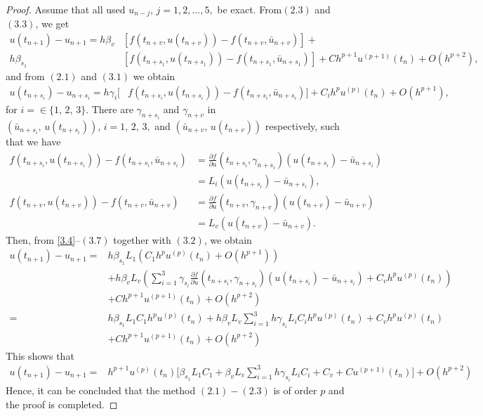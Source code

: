 ‎\documentclass[a4paper,10pt]{article}‎
\begin{document}
\begin{proof}
Assume that all used
 $u_{n-j},\,j=1,2,\ldots,5,$  be exact. From$(2.3)$ and $(3.3)$, we get
\begin{align}\label{3.4}
  u(t_{n+1}) -u_{n+1}=
  h\beta_{v}&[f(t_{n+ v},u(t_{n+v}))-f(t_{n+ v},\bar{u}_{n+v})]+\\
    h\beta_{s_{1}}&[f(t_{n+ s_{1}},u(t_{n+s_{1}}))
-f(t_{n+ s_{1}},\bar{u}_{n+s_{1}})]
+Ch^{p+1}u^{(p+1)}(t_{n})+O(h^{p+2}),\nonumber
\end{align}
and from $(2.1)$ and $(3.1)$ we
obtain
\begin{align}\label{3.5}
  u(t_{n+s_{i}}) -u_{n+s_{i}}=
  h\gamma _{i}[& f(t_{n+ s_{i}},u(t_{n+s_{i}}))
-f(t_{n+ s_{i}},\bar{u}_{n+s_{i}})]
+C_{i}h^{p}u^{(p)}(t_{n})+O(h^{p+1}),%
\end{align}
for $i=\in \{1,\,2,\,3\}.$ There are $\gamma_{n+s_{i}}$ and $\gamma_{n+v}$ in  $( \bar{u}_{n+s_{i}},\,u(t_{n+s_{i}} )),\,i=1,\,2,\,3,$  
and $( \bar{u}_{n+v},\,u(t_{n+v} ))$  respectively,
such that we have
\begin{align}
f(t_{n+s_{i}},u(t_{n+ s_{i}}))-f(t_{n+ s_{i}},\bar{u}_{n+s_{i}}) &=\frac{\partial f}{\partial u}(t_{n+s_{i}},\gamma_{n+s_{i}})
(u(t_{n+s_{i}})-\bar{u}_{n+s_{i}})\\
&=L_{i}(u(t_{n+s_{i}})-\bar{u}_{n+s_{i}}),\nonumber\\
 f(t_{n+v},u(t_{n+ v}))-f(t_{n+ v},\bar{u}_{n+v}) &=\frac{\partial f}{\partial u}(t_{n+v},\gamma_{n+v})
(u(t_{n+v})-\bar{u}_{n+v})\\
&=L_{v}(u(t_{n+v})-\bar{u}_{n+v}).\nonumber
\end{align}
Then, from \eqref{3.4}--$(3.7)$ together with  $(3.2)$, we obtain
\begin{align*}\label{}
  u(t_{n+1}) -u_{n+1}=&
  h\beta_{s_{1}}L_{1}(C_{1}h^{p}u^{(p)}(t_{n})+O(h^{p+1}))\\
 & +h\beta_{v}L_{v}(\sum_{i=1}^{3}\gamma_{s_{i}}\frac{\partial f}{\partial u}(t_{n+s_{i}},\gamma_{n+s_{i}})(u(t_{n+s_{i}})-\bar{u}_{n+s_{i}})+C_{v}h^{p}u^{(p)}(t_{n}))\\ 
  &+Ch^{p+1}u^{(p+1)}(t_{n})+O(h^{p+2})\\
=& h\beta_{s_{1}}L_{1}C_{1}h^{p}u^{(p)}(t_{n}) +h\beta_{v}L_{v}\sum_{i=1}^{3}h\gamma_{s_{i}}L_{i}C_{i}h^{p}u^{(p)}(t_{n})+C_{v}h^{p}u^{(p)}(t_{n})\\ 
  &+Ch^{p+1}u^{(p+1)}(t_{n})+O(h^{p+2})  
\end{align*}
This shows that
\begin{align*}\label{}
  u(t_{n+1}) -u_{n+1}=& h^{p+1}u^{(p)}(t_{n})\bigg[\beta_{s_{1}}L_{1}C_{1} +\beta_{v}L_{v}\sum_{i=1}^{3}h\gamma_{s_{i}}L_{i}C_{i}+C_{v} 
 +Cu^{(p+1)}(t_{n})\bigg]+O(h^{p+2}) 
\end{align*}
Hence, it can be concluded  that the method $(2.1)-(2.3)$ is of order $p$ and the proof is  completed.
\end{proof}
\end{document}
